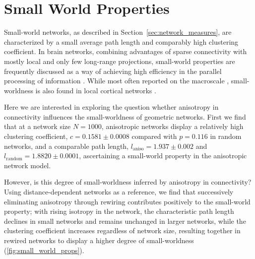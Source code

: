 

\section{Small World Properties}\label{sec:small_world}

Small-world networks, as described in
Section~\ref{sec:network_measures}, are characterized by a small
average path length and comparably high clustering coefficient. In
brain networks, combining advantages of sparse connectivity with
mostly local and only few long-range projections, small-world
properties are frequently discussed as a way of achieving high
efficiency in the parallel processing of
information \parencite[cf.][]{Achard2007}. While most often reported
on the macroscale \parencite{SpornsZwi2004, Bassett2006},
small-worldness is also found in local cortical
networks \parencite[SI]{Perin2011}.

Here we are interested in exploring the question whether
an\-iso\-tropy in connectivity influences the small-worldness of
geometric networks. First we find that at a network size $N=1000$,
anisotropic networks display a relatively high clustering coefficient,
$c = 0.1581 \pm 0.0008$ compared with $p = 0.116$ in random networks,
and a comparable path length, $l_{\mathrm{aniso}} = 1.937 \pm 0.002$
and $l_{\mathrm{random}} = 1.8820 \pm 0.0001$, %
ascertaining a small-world property in the anisotropic network model.

However, is this degree of small-worldness inferred by anisotropy in
connectivity? Using distance-dependent networks as a reference, we
find that successively eliminating anisotropy through rewiring
contributes positively to the small-world property; with rising
isotropy in the network, the characteristic path length declines in
small networks and remains unchanged in larger networks, while the
clustering coefficient increases regardless of network size, resulting
together in rewired networks to display a higher degree of
small-worldness (\autoref{fig:small_world_props}).

